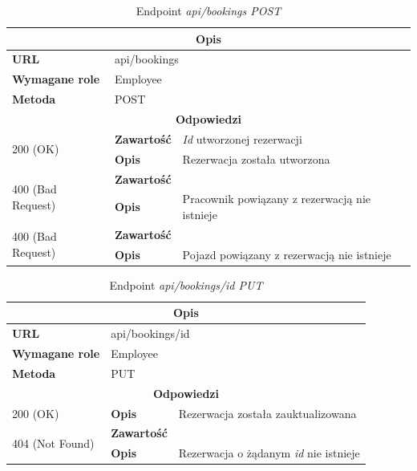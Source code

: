 \documentclass[eng,printmode,openany]{mgr}
\begin{document}
	\begin{table}[H]
		\caption{Endpoint \textit{api/bookings POST}}
		\begin{tabularx}{\textwidth}{|l|l|X|}
			\hline
			\multicolumn{3}{|c|}{\textbf{\textbf{Opis}}}
			\\ \hline
			\textbf{URL}                       & \multicolumn{2}{l|}{api/bookings}
			\\ \hline
			\textbf{Wymagane role}             & \multicolumn{2}{l|}{Employee}
			\\ \hline
			\textbf{Metoda}                    & \multicolumn{2}{l|}{POST}
			\\ \hline
			\multicolumn{3}{|c|}{\textbf{Odpowiedzi}}
			\\ \hline
			\multirow{2}{*}{200 (OK)} 		& \textbf{Zawartość}     & \textit{Id} utworzonej rezerwacji
			\\ \cline{2-3}                  & \textbf{Opis}         	& Rezerwacja została utworzona
			\\ \hline
			\multirow{2}{*}{400 (Bad Request)} 	& \textbf{Zawartość}     &  
			\\ \cline{2-3}                      & \textbf{Opis}          & Pracownik powiązany z rezerwacją nie istnieje
			\\ \hline
			\multirow{2}{*}{400 (Bad Request)} 	& \textbf{Zawartość}     &  
			\\ \cline{2-3}                      & \textbf{Opis}          & Pojazd powiązany z rezerwacją nie istnieje
			\\ \hline
		\end{tabularx}
	\end{table}
	
	\begin{table}[H]
		\caption{Endpoint \textit{api/bookings/id PUT}}
		\begin{tabularx}{\textwidth}{|l|l|X|}
			\hline
			\multicolumn{3}{|c|}{\textbf{\textbf{Opis}}}
			\\ \hline
			\textbf{URL}                       & \multicolumn{2}{l|}{api/bookings/id}
			\\ \hline
			\textbf{Wymagane role}             & \multicolumn{2}{l|}{Employee}
			\\ \hline
			\textbf{Metoda}                    & \multicolumn{2}{l|}{PUT}
			\\ \hline
			\multicolumn{3}{|c|}{\textbf{Odpowiedzi}}
			\\ \hline
			200 (OK) 		                        & \textbf{Opis}      	& Rezerwacja została zauktualizowana
			\\ \hline
			\multirow{2}{*}{404 (Not Found)} 	    & \textbf{Zawartość}     & 
			\\ \cline{2-3}                          & \textbf{Opis}          & Rezerwacja o żądanym \textit{id} nie istnieje
			\\ \hline
		\end{tabularx}
	\end{table}
	
\end{document}
